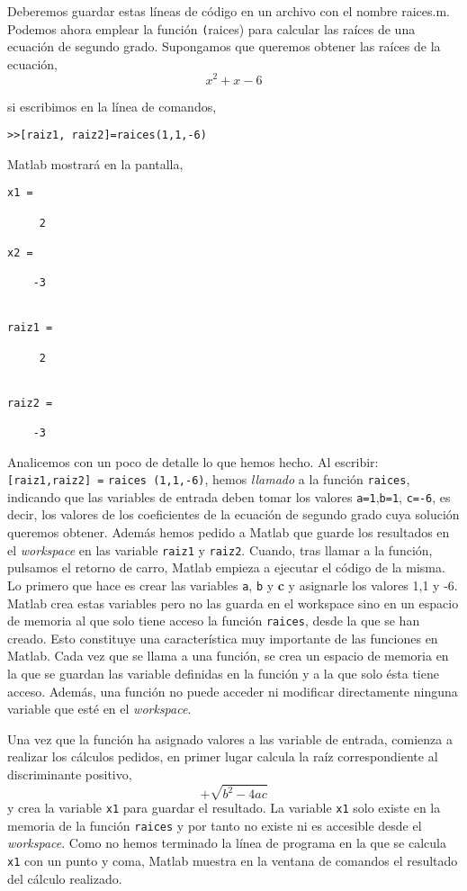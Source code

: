 Deberemos guardar estas líneas de código en un archivo con el nombre raices.m. Podemos ahora emplear la función \texttt(raices) para calcular las raíces de una ecuación de segundo grado. Supongamos que queremos obtener las raíces de la ecuación,
\begin{equation*}
x^2+x-6
\end{equation*}

si escribimos en la línea de comandos,
\begin{verbatim}
>>[raiz1, raiz2]=raices(1,1,-6)
\end{verbatim}
Matlab mostrará en la pantalla,

\begin{verbatim}
x1 =

     2
     
x2 =

    -3


raiz1 =

     2


raiz2 =

    -3

\end{verbatim}

Analicemos con un poco de detalle lo que hemos hecho. Al escribir: \texttt{[raiz1,raiz2] =} \texttt{raices (1,1,-6)}, hemos \emph{llamado} a la función \texttt{raices}, indicando que las variables de entrada deben tomar los valores \texttt{a=1},\texttt{b=1}, \texttt{c=-6}, es decir, los valores de los coeficientes de la ecuación de segundo grado cuya solución queremos obtener. Además hemos pedido a Matlab que guarde los resultados en el \emph{workspace} en las variable \texttt{raiz1} y \texttt{raiz2}. Cuando, tras llamar a la función, pulsamos el retorno de carro, Matlab empieza a ejecutar el código de la misma. Lo primero que hace es crear las variables \texttt{a}, \texttt{b} y \textbf{c} y asignarle los valores 1,1 y -6. Matlab crea estas variables pero no las guarda en el workspace sino en un espacio de memoria al que solo tiene acceso la función \texttt{raices}, desde la que se han creado. 
Esto constituye una característica muy importante de las funciones en Matlab. Cada vez que se llama a una función, se crea un espacio de memoria en la que se guardan las variable definidas en la función y a la que solo ésta tiene acceso. Además, una función no puede acceder ni modificar directamente ninguna variable que esté en el \emph{workspace}.

Una vez que la función ha asignado valores a las variable de entrada, comienza a realizar los cálculos pedidos, en primer lugar calcula la raíz correspondiente al discriminante positivo,
\begin{equation*}
+\sqrt{b^2-4ac}
\end{equation*}
y crea la variable \texttt{x1} para guardar el resultado. La variable \texttt{x1} solo existe en la memoria de la función \texttt{raices} y por tanto no existe ni es accesible desde el \emph{workspace}. Como no hemos terminado la línea de programa en la que se calcula \texttt{x1} con un punto y coma, Matlab muestra en la ventana de comandos el resultado del cálculo realizado. 

